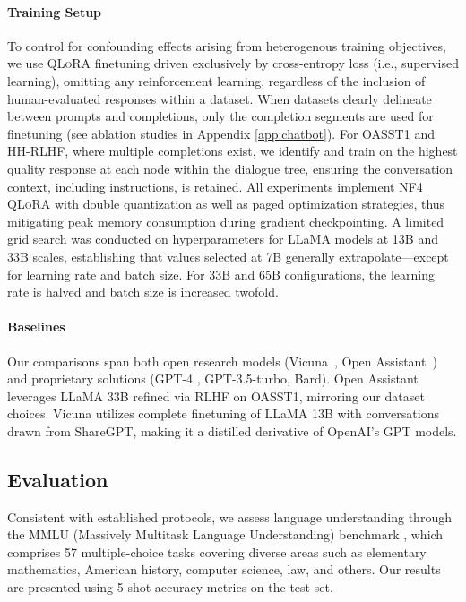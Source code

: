 \paragraph{Training Setup} To control for confounding effects arising from heterogenous training objectives, we use \textsc{QLoRA} finetuning driven exclusively by cross-entropy loss (i.e., supervised learning), omitting any reinforcement learning, regardless of the inclusion of human-evaluated responses within a dataset. When datasets clearly delineate between prompts and completions, only the completion segments are used for finetuning (see ablation studies in Appendix \ref{app:chatbot}). For OASST1 and HH-RLHF, where multiple completions exist, we identify and train on the highest quality response at each node within the dialogue tree, ensuring the conversation context, including instructions, is retained. All experiments implement NF4 \textsc{QLoRA} with double quantization as well as paged optimization strategies, thus mitigating peak memory consumption during gradient checkpointing. A limited grid search was conducted on hyperparameters for LLaMA models at 13B and 33B scales, establishing that values selected at 7B generally extrapolate—except for learning rate and batch size. For 33B and 65B configurations, the learning rate is halved and batch size is increased twofold.

\paragraph{Baselines} Our comparisons span both open research models (Vicuna~\citep{vicuna2023}, Open Assistant~\citep{kopf2023openassistant}) and proprietary solutions (GPT-4 \citep{openai2023gpt}, GPT-3.5-turbo, Bard). Open Assistant leverages LLaMA 33B refined via RLHF on OASST1, mirroring our dataset choices. Vicuna utilizes complete finetuning of LLaMA 13B with conversations drawn from ShareGPT, making it a distilled derivative of OpenAI’s GPT models.

\subsection{Evaluation}

Consistent with established protocols, we assess language understanding through the MMLU (Massively Multitask Language Understanding) benchmark \citep{hendrycksmeasuring}, which comprises 57 multiple-choice tasks covering diverse areas such as elementary mathematics, American history, computer science, law, and others. Our results are presented using 5-shot accuracy metrics on the test set.

